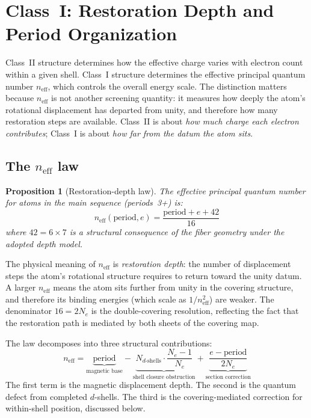 \documentclass[11pt,a4paper]{article}
\newtheorem{proposition}[theorem]{Proposition}
\begin{document}
\section{Class~I: Restoration Depth and Period Organization}
\label{sec:class-i}

Class~II structure determines how the effective charge varies with electron count within a given shell. Class~I structure determines the effective principal quantum number $n_{\mathrm{eff}}$, which controls the overall energy scale. The distinction matters because $n_{\mathrm{eff}}$ is not another screening quantity: it measures how deeply the atom's rotational displacement has departed from unity, and therefore how many restoration steps are available. Class~II is about \emph{how much charge each electron contributes}; Class~I is about \emph{how far from the datum the atom sits}.

\subsection{The $n_{\mathrm{eff}}$ law}

\begin{proposition}[Restoration-depth law]
\label{prop:neff}
The effective principal quantum number for atoms in the main sequence (periods~3+) is:
\[
n_{\mathrm{eff}}(\mathrm{period}, e) = \frac{\mathrm{period} + e + 42}{16}
\]
where $42 = 6 \times 7$ is a structural consequence of the fiber geometry under the adopted depth model.
\end{proposition}

The physical meaning of $n_{\mathrm{eff}}$ is \emph{restoration depth}: the number of displacement steps the atom's rotational structure requires to return toward the unity datum. A larger $n_{\mathrm{eff}}$ means the atom sits further from unity in the covering structure, and therefore its binding energies (which scale as $1/n_{\mathrm{eff}}^2$) are weaker. The denominator $16 = 2N_e$ is the double-covering resolution, reflecting the fact that the restoration path is mediated by both sheets of the covering map.

The law decomposes into three structural contributions:
\[
n_{\mathrm{eff}} = \underbrace{\mathrm{period}}_{\text{magnetic base}} - \underbrace{N_{d\text{-shells}} \cdot \frac{N_e - 1}{N_e}}_{\text{shell closure obstruction}} + \underbrace{\frac{e - \mathrm{period}}{2 N_e}}_{\text{section correction}}
\]
The first term is the magnetic displacement depth. The second is the quantum defect from completed $d$-shells. The third is the covering-mediated correction for within-shell position, discussed below.
\end{document}
